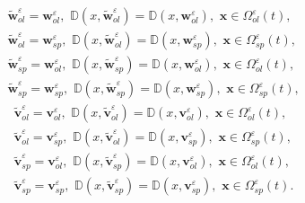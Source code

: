 \documentclass{article}
\theoremstyle{plain}
\theoremstyle{definition}
\numberwithin{equation}{section}
\begin{document}
\begin{equation}\label{eq2.17}
\begin{aligned}
&
\widetilde{\boldsymbol{w}}^{\varepsilon}_{ol}=\boldsymbol{w}^{\varepsilon}_{ol},\,\,
\mathbb{D}(x,\widetilde{\boldsymbol{w}}_{ol}^{\varepsilon})=
\mathbb{D}(x,\boldsymbol{w}_{ol}^{\varepsilon}),\,\,\boldsymbol{x}\in\Omega^{\varepsilon}_{ol}(t),
\\
& \widetilde{\boldsymbol{w}}^{\varepsilon}_{ol}=\boldsymbol{w}^{\varepsilon}_{sp},\,\,
\mathbb{D}(x,\widetilde{\boldsymbol{w}}_{ol}^{\varepsilon})=
\mathbb{D}(x,\boldsymbol{w}_{sp}^{\varepsilon}),\,\,\boldsymbol{x}\in\Omega^{\varepsilon}_{sp}(t),
\\
& \widetilde{\boldsymbol{w}}^{\varepsilon}_{sp}=\boldsymbol{w}^{\varepsilon}_{ol},\,\,
\mathbb{D}(x,\widetilde{\boldsymbol{w}}_{sp}^{\varepsilon})=
\mathbb{D}(x,\boldsymbol{w}_{ol}^{\varepsilon}),\,\,\boldsymbol{x}\in\Omega^{\varepsilon}_{ol}(t),
\\
& \widetilde{\boldsymbol{w}}^{\varepsilon}_{sp}=\boldsymbol{w}^{\varepsilon}_{sp},\,\,
\mathbb{D}(x,\widetilde{\boldsymbol{w}}_{sp}^{\varepsilon})=
\mathbb{D}(x,\boldsymbol{w}_{sp}^{\varepsilon}),\,\,\boldsymbol{x}\in\Omega^{\varepsilon}_{sp}(t),
\end{aligned}
\end{equation}
\begin{equation*}
\begin{aligned}
&
\widetilde{\boldsymbol{v}}^{\varepsilon}_{ol}=\boldsymbol{v}^{\varepsilon}_{ol},\,\,
\mathbb{D}(x,\widetilde{\boldsymbol{v}}_{ol}^{\varepsilon})=
\mathbb{D}(x,\boldsymbol{v}_{ol}^{\varepsilon}),\,\,\boldsymbol{x}\in\Omega^{\varepsilon}_{ol}(t),
\\
& \widetilde{\boldsymbol{v}}^{\varepsilon}_{ol}=\boldsymbol{v}^{\varepsilon}_{sp},\,\,
\mathbb{D}(x,\widetilde{\boldsymbol{v}}_{ol}^{\varepsilon})=
\mathbb{D}(x,\boldsymbol{v}_{sp}^{\varepsilon}),\,\,\boldsymbol{x}\in\Omega^{\varepsilon}_{sp}(t),
\\
& \widetilde{\boldsymbol{v}}^{\varepsilon}_{sp}=\boldsymbol{v}^{\varepsilon}_{ol},\,\,
\mathbb{D}(x,\widetilde{\boldsymbol{v}}_{sp}^{\varepsilon})=
\mathbb{D}(x,\boldsymbol{v}_{ol}^{\varepsilon}),\,\,\boldsymbol{x}\in\Omega^{\varepsilon}_{ol}(t),
\\
& \widetilde{\boldsymbol{v}}^{\varepsilon}_{sp}=\boldsymbol{v}^{\varepsilon}_{sp},\,\,
\mathbb{D}(x,\widetilde{\boldsymbol{v}}_{sp}^{\varepsilon})=
\mathbb{D}(x,\boldsymbol{v}_{sp}^{\varepsilon}),\,\,\boldsymbol{x}\in\Omega^{\varepsilon}_{sp}(t).
\end{aligned}
\end{equation*}
\end{document}
